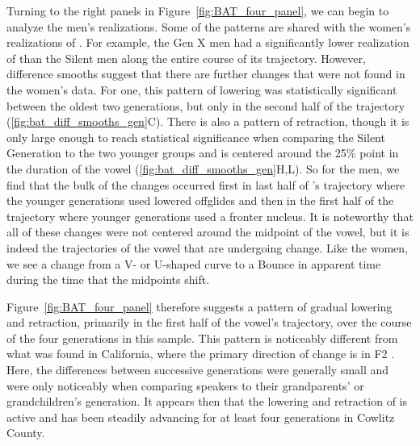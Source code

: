 Turning to the right panels in Figure~\ref{fig:BAT_four_panel}, we can begin to analyze the men's realizations. Some of the patterns are shared with the women's realizations of \bat. For example, the Gen X men had a significantly lower realization of \bat than the Silent men along the entire course of its trajectory. However, difference smooths suggest that there are further changes that were not found in the women's data. For one, this pattern of lowering \bat was statistically significant between the oldest two generations, but only in the second half of the trajectory (\ref{fig:bat_diff_smooths_gen}C). There is also a pattern of retraction, though it is only large enough to reach statistical significance when comparing the Silent Generation to the two younger groups and is centered around the 25\% point in the duration of the vowel (\ref{fig:bat_diff_smooths_gen}H,L). So for the men, we find that the bulk of the changes occurred first in last half of \bat's trajectory where the younger generations used lowered offglides and then in the first half of the trajectory where younger generations used a fronter nucleus. It is noteworthy that all of these changes were not centered around the midpoint of the vowel, but it is indeed the trajectories of the vowel that are undergoing change. Like the women, we see a change from a V- or U-shaped curve to a Bounce in apparent time during the time that the midpoints shift.

Figure~\ref{fig:BAT_four_panel} therefore suggests a pattern of gradual lowering and retraction, primarily in the first half of the vowel's trajectory, over the course of the four generations in this sample. This pattern is noticeably different from what was found in California, where the primary direction of change is in F2 \citep{donofrio_etal_2019}. Here, the differences between successive generations were generally small and were only noticeably when comparing speakers to their grandparents' or grandchildren's generation. It appears then that the lowering and retraction of \bat is active and has been steadily advancing for at least four generations in Cowlitz County.

